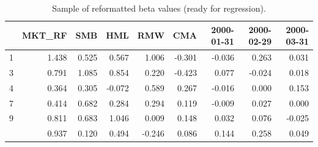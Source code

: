 \documentclass[]{krantz}
\makeatletter
\newenvironment{Shaded}{\begin{snugshade}}{\end{snugshade}}
\newcommand{\CommentTok}[1]{\textcolor[rgb]{0.37,0.37,0.37}{\textit{#1}}}
\newcommand{\DataTypeTok}[1]{\textcolor[rgb]{0.27,0.27,0.27}{#1}}
\newcommand{\DecValTok}[1]{\textcolor[rgb]{0.06,0.06,0.06}{#1}}
\newcommand{\KeywordTok}[1]{\textcolor[rgb]{0.27,0.27,0.27}{\textbf{#1}}}
\newcommand{\NormalTok}[1]{#1}
\newcommand{\OperatorTok}[1]{\textcolor[rgb]{0.43,0.43,0.43}{\textbf{#1}}}
\newcommand{\OtherTok}[1]{\textcolor[rgb]{0.37,0.37,0.37}{#1}}
\newcommand{\StringTok}[1]{\textcolor[rgb]{0.5,0.5,0.5}{#1}}
\newenvironment{kframe}{%
\medskip{}
\setlength{\fboxsep}{.8em}
 \def\at@end@of@kframe{}%
 \ifinner\ifhmode%
  \def\at@end@of@kframe{\end{minipage}}%
  \begin{minipage}{\columnwidth}%
 \fi\fi%
 \def\FrameCommand##1{\hskip\@totalleftmargin \hskip-\fboxsep
 \colorbox{shadecolor}{##1}\hskip-\fboxsep
     \hskip-\linewidth \hskip-\@totalleftmargin \hskip\columnwidth}%
 \MakeFramed {\advance\hsize-\width
   \@totalleftmargin\z@ \linewidth\hsize
   \@setminipage}}%
 {\par\unskip\endMakeFramed%
 \at@end@of@kframe}
\renewenvironment{Shaded}{\begin{kframe}}{\end{kframe}}
\theoremstyle{definition}
\theoremstyle{definition}
\theoremstyle{definition}
\theoremstyle{remark}
\makeatother
\begin{document}
\footnotesize

\begin{Shaded}
\end{Shaded}

\begin{table}[t]

\caption{\label{tab:betaformat}Sample of reformatted beta values (ready for regression).}
\centering
\begin{tabular}{lrrrrrrrr}
\toprule
  & MKT\_RF & SMB & HML & RMW & CMA & 2000-01-31 & 2000-02-29 & 2000-03-31\\
\midrule
1 & 1.438 & 0.525 & 0.567 & 1.006 & -0.301 & -0.036 & 0.263 & 0.031\\
3 & 0.791 & 1.085 & 0.854 & 0.220 & -0.423 & 0.077 & -0.024 & 0.018\\
4 & 0.364 & 0.305 & -0.072 & 0.589 & 0.267 & -0.016 & 0.000 & 0.153\\
7 & 0.414 & 0.682 & 0.284 & 0.294 & 0.119 & -0.009 & 0.027 & 0.000\\
9 & 0.811 & 0.683 & 1.046 & 0.009 & 0.148 & 0.032 & 0.076 & -0.025\\
\addlinespace
11 & 0.937 & 0.120 & 0.494 & -0.246 & 0.086 & 0.144 & 0.258 & 0.049\\
\bottomrule
\end{tabular}
\end{table}
\end{document}
